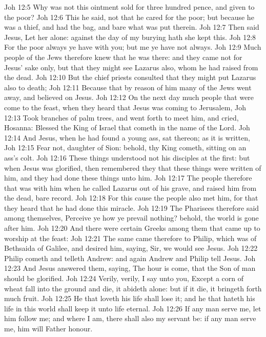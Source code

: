 \vs Joh 12:5 Why was not this ointment sold for three hundred pence, and given to the poor?
\vs Joh 12:6 This he said, not that he cared for the poor; but because he was a thief, and had the bag, and bare what was put therein.
\vs Joh 12:7 Then said Jesus, Let her alone: against the day of my burying hath she kept this.
\vs Joh 12:8 For the poor always ye have with you; but me ye have not always.
\vs Joh 12:9 Much people of the Jews therefore knew that he was there: and they came not for Jesus' sake only, but that they might see Lazarus also, whom he had raised from the dead.
\vs Joh 12:10 But the chief priests consulted that they might put Lazarus also to death;
\vs Joh 12:11 Because that by reason of him many of the Jews went away, and believed on Jesus.
\vs Joh 12:12 On the next day much people that were come to the feast, when they heard that Jesus was coming to Jerusalem,
\vs Joh 12:13 Took branches of palm trees, and went forth to meet him, and cried, Hosanna: Blessed  the King of Israel that cometh in the name of the Lord.
\vs Joh 12:14 And Jesus, when he had found a young ass, sat thereon; as it is written,
\vs Joh 12:15 Fear not, daughter of Sion: behold, thy King cometh, sitting on an ass's colt.
\vs Joh 12:16 These things understood not his disciples at the first: but when Jesus was glorified, then remembered they that these things were written of him, and  they had done these things unto him.
\vs Joh 12:17 The people therefore that was with him when he called Lazarus out of his grave, and raised him from the dead, bare record.
\vs Joh 12:18 For this cause the people also met him, for that they heard that he had done this miracle.
\vs Joh 12:19 The Pharisees therefore said among themselves, Perceive ye how ye prevail nothing? behold, the world is gone after him.
\vs Joh 12:20 And there were certain Greeks among them that came up to worship at the feast:
\vs Joh 12:21 The same came therefore to Philip, which was of Bethsaida of Galilee, and desired him, saying, Sir, we would see Jesus.
\vs Joh 12:22 Philip cometh and telleth Andrew: and again Andrew and Philip tell Jesus.
\vs Joh 12:23 And Jesus answered them, saying, The hour is come, that the Son of man should be glorified.
\vs Joh 12:24 Verily, verily, I say unto you, Except a corn of wheat fall into the ground and die, it abideth alone: but if it die, it bringeth forth much fruit.
\vs Joh 12:25 He that loveth his life shall lose it; and he that hateth his life in this world shall keep it unto life eternal.
\vs Joh 12:26 If any man serve me, let him follow me; and where I am, there shall also my servant be: if any man serve me, him will  Father honour.
